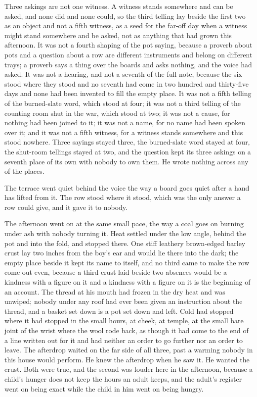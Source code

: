 Three askings are not one witness. A witness stands somewhere and can be asked, and none did and none could, so the third telling lay beside the first two as an object and not a fifth witness, as a seed for the far-off day when a witness might stand somewhere and be asked, not as anything that had grown this afternoon. It was not a fourth shaping of the pot saying, because a proverb about pots and a question about a row are different instruments and belong on different trays; a proverb says a thing over the boards and asks nothing, and the voice had asked. It was not a hearing, and not a seventh of the full note, because the six stood where they stood and no seventh had come in two hundred and thirty-five days and none had been invented to fill the empty place. It was not a fifth telling of the burned-slate word, which stood at four; it was not a third telling of the counting room shut in the war, which stood at two; it was not a cause, for nothing had been joined to it; it was not a name, for no name had been spoken over it; and it was not a fifth witness, for a witness stands somewhere and this stood nowhere. Three sayings stayed three, the burned-slate word stayed at four, the shut-room tellings stayed at two, and the question kept its three askings on a seventh place of its own with nobody to own them. He wrote nothing across any of the places.

The terrace went quiet behind the voice the way a board goes quiet after a hand has lifted from it. The row stood where it stood, which was the only answer a row could give, and it gave it to nobody.

\scenebreak

The afternoon went on at the same small pace, the way a coal goes on burning under ash with nobody turning it. Heat settled under the low angle, behind the pot and into the fold, and stopped there. One stiff leathery brown-edged barley crust lay two inches from the boy's ear and would lie there into the dark; the empty place beside it kept its name to itself, and no third came to make the row come out even, because a third crust laid beside two absences would be a kindness with a figure on it and a kindness with a figure on it is the beginning of an account. The thread at his mouth had frozen in the dry heat and was unwiped; nobody under any roof had ever been given an instruction about the thread, and a basket set down is a pot set down and left. Cold had stopped where it had stopped in the small hours, at cheek, at temple, at the small bare joint of the wrist where the wool rode back, as though it had come to the end of a line written out for it and had neither an order to go further nor an order to leave. The afterdrop waited on the far side of all three, past a warming nobody in this house would perform. He knew the afterdrop when he saw it. He wanted the crust. Both were true, and the second was louder here in the afternoon, because a child's hunger does not keep the hours an adult keeps, and the adult's register went on being exact while the child in him went on being hungry.

